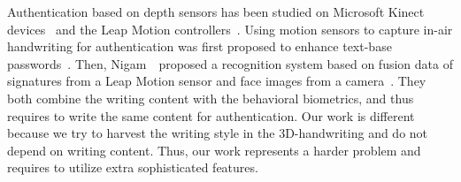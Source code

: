 
Authentication based on depth sensors has been studied on Microsoft Kinect devices~\cite{GaitKinectMS,Hayashi2014:WMU} and the Leap Motion controllers~\cite{Aslan14:LeapMidAirGesture, ICDAR15:OnlineHandwriting}.
Using motion sensors to capture in-air handwriting for authentication was first proposed to enhance text-base passwords~\cite{TianQXW13:NDSS13}. Then, Nigam~\etal ~proposed a recognition system based on fusion data of signatures from a Leap Motion sensor and face images from a camera~\cite{Nigam15:LeapSigVeri}. They both combine the writing content with the behavioral biometrics, and thus requires to write the same content for authentication.  
Our work is different because we try to harvest the writing style in the 3D-handwriting and do not depend on writing content. Thus, our work represents a harder problem and requires to utilize extra sophisticated features. 


